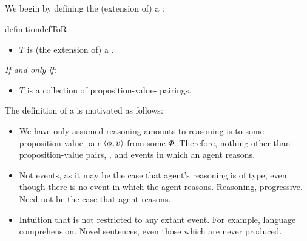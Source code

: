 \subsection{}
\label{cha:typical:sec:tR:ToRdef}

\begin{note}
  We begin by defining the (extension of) a \tor{}:

  \begin{restatable}[\tor{2}]{definition}{defToR}
    \label{def:tor}
    \mbox{ }
    \vspace{-\baselineskip}
    \begin{itemize}
    \item
      \(T\) is (the extension of) a \emph{}.
    \end{itemize}

    \emph{If and only if}:

    \begin{itemize}
    \item
      \(T\) is a collection of proposition-value-\poP{} pairings.
    \end{itemize}
    \vspace{-\baselineskip}
  \end{restatable}

  The definition of a \tor{} is motivated as follows:
  \begin{itemize}
  \item
    We have only assumed reasoning amounts to reasoning is to some proposition-value pair \(\langle \phi, v \rangle\) from some \poP{} \(\Phi\).
    Therefore, nothing other than proposition-value pairs, , and events in which an agent reasons.
  \item
    Not events, as it may be the case that agent's reasoning is of type, even though there is no event in which the agent reasons.
    Reasoning, progressive.
    Need not be the case that agent reasons.
  \item
    Intuition that \tor{} is not restricted to any extant event.
    For example, language comprehension.
    Novel sentences, even those which are never produced.
  \end{itemize}
\end{note}


